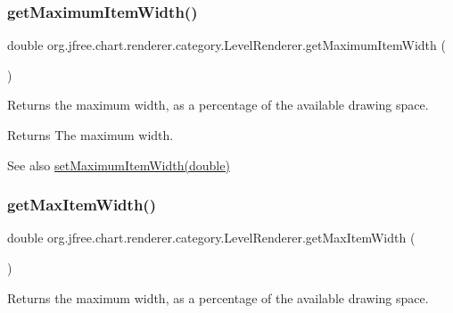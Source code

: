 \subsubsection{\texorpdfstring{get\+Maximum\+Item\+Width()}{getMaximumItemWidth()}}
{\footnotesize\ttfamily double org.\+jfree.\+chart.\+renderer.\+category.\+Level\+Renderer.\+get\+Maximum\+Item\+Width (\begin{DoxyParamCaption}{ }\end{DoxyParamCaption})}

Returns the maximum width, as a percentage of the available drawing space.

\begin{DoxyReturn}{Returns}
The maximum width.
\end{DoxyReturn}
\begin{DoxySeeAlso}{See also}
\mbox{\hyperlink{classorg_1_1jfree_1_1chart_1_1renderer_1_1category_1_1_level_renderer_ab661cdb9984c132949d5229d1f581bb4}{set\+Maximum\+Item\+Width(double)}} 
\end{DoxySeeAlso}
\mbox{\label{classorg_1_1jfree_1_1chart_1_1renderer_1_1category_1_1_level_renderer_a1953acdda4493fca8a9af2ee0f793e8e}} 
\subsubsection{\texorpdfstring{get\+Max\+Item\+Width()}{getMaxItemWidth()}}
{\footnotesize\ttfamily double org.\+jfree.\+chart.\+renderer.\+category.\+Level\+Renderer.\+get\+Max\+Item\+Width (\begin{DoxyParamCaption}{ }\end{DoxyParamCaption})}

Returns the maximum width, as a percentage of the available drawing space.

